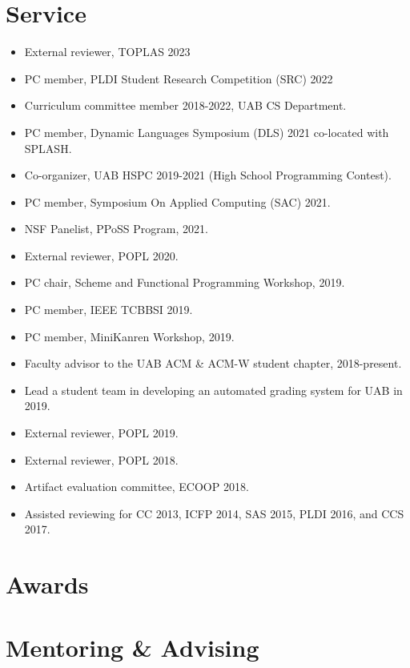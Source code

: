 \documentclass[line]{res}
\begin{document}
\begin{resume}
\section{\large Service} \vspace{0.15in}
\begin{itemize}
    \item External reviewer, TOPLAS 2023
    \item PC member, PLDI Student Research Competition (SRC) 2022
    \item Curriculum committee member 2018-2022, UAB CS Department.
    \item PC member, Dynamic Languages Symposium (DLS) 2021 co-located with SPLASH.
    \item Co-organizer, UAB HSPC 2019-2021 (High School Programming Contest).
    \item PC member, Symposium On Applied Computing (SAC) 2021.
    \item NSF Panelist, PPoSS Program, 2021.
    \item External reviewer, POPL 2020.
    \item PC chair, Scheme and Functional Programming Workshop, 2019.
    \item PC member, IEEE TCBBSI 2019.
    \item PC member, MiniKanren Workshop, 2019.
    \item Faculty advisor to the UAB ACM \& ACM-W student chapter, 2018-present.
    \item Lead a student team in developing an automated grading system for UAB in 2019.
    \item External reviewer, POPL 2019. 
    \item External reviewer, POPL 2018. 
    \item Artifact evaluation committee, ECOOP 2018.
    \item Assisted reviewing for CC 2013, ICFP 2014, SAS 2015, PLDI 2016, and CCS 2017.
\end{itemize}

\section{\large Awards} \vspace{0.15in}


\section{\large Mentoring \& Advising}


\end{resume}
\end{document}

